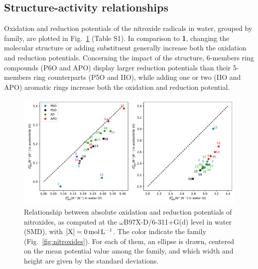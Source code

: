 \documentclass[review]{elsarticle}
\begin{document}
\subsection{Structure-activity relationships}

Oxidation and reduction potentials of the nitroxide radicals in water, grouped by family, are plotted in Fig.~\ref{fig:family} (Table S1). In comparison to \textbf{1}, changing the molecular structure or adding substituent generally increase both the oxidation and reduction potentials. Concerning the impact of the structure, 6-members ring compounds (P6O and APO)  display larger reduction potentials than their 5-members ring counterparts (P5O and  IIO), while adding one or two (IIO and APO) aromatic rings increase both the oxidation and reduction potential. 

\begin{figure}[!h]
	\centering
	\includegraphics[width=.9\linewidth]{Figure7}
	\caption{Relationship between absolute oxidation and reduction potentials of nitroxides, as computed at the $\omega$B97X-D/6-311+G(d) level in water (SMD), with $[\ce{X}]=\SI{0}{\mole\per\liter}$. The color indicate the family (Fig.~\ref{fig:nitroxides}). For each of them, an ellipse is drawn, centered on the mean potential value among the family, and which width and height are given by the standard deviations.}
	\label{fig:family}
\end{figure}
\end{document}
